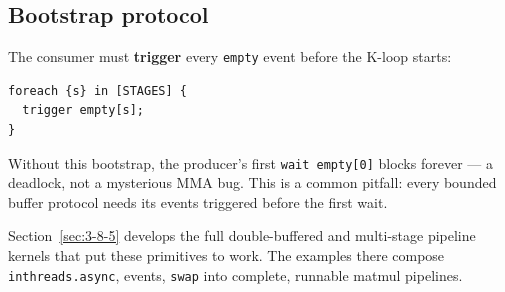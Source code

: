 \subsection*{Bootstrap protocol}

The consumer must \textbf{trigger} every \texttt{empty} event before the K-loop starts:

\begin{lstlisting}[language=croqtile,caption={Bootstrap protocol}]
foreach {s} in [STAGES] {
  trigger empty[s];
}
\end{lstlisting}

Without this bootstrap, the producer's first \texttt{wait empty[0]} blocks forever --- a deadlock, not a mysterious MMA bug. This is a common pitfall: every bounded buffer protocol needs its events triggered before the first wait.

Section~\ref{sec:3-8-5} develops the full double-buffered and multi-stage pipeline kernels that put these primitives to work. The examples there compose \texttt{inthreads.\allowbreak{}async}, events, \texttt{swap} into complete, runnable matmul pipelines.
